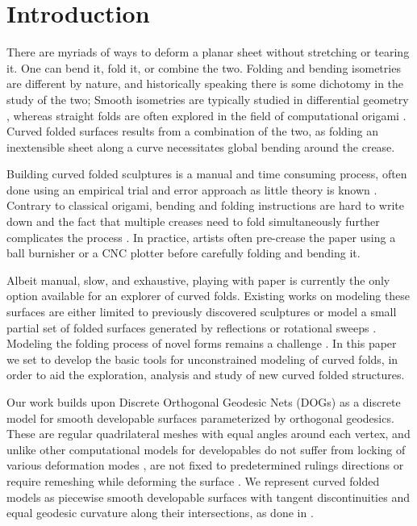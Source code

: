 \section{Introduction}
There are myriads of ways to deform a planar sheet without stretching or tearing it. One can bend it, fold it, or combine the two. Folding and bending isometries are different by nature, and historically speaking there is some dichotomy in the study of the two; Smooth isometries are typically studied in differential geometry \cite{do_carmo}, whereas straight folds are often explored in the field of computational origami \cite{origami_book}. Curved folded surfaces \cite{huffman} results from a combination of the two, as folding an inextensible sheet along a curve necessitates global bending around the crease.

Building curved folded sculptures is a manual and time consuming process, often done using an empirical trial and error approach  as little theory is known \cite{curved_review,huffmann_reconstructing}. Contrary to classical origami, bending and folding instructions are hard to write down and the fact that multiple creases need to fold simultaneously further complicates the process \cite{StringActuated:2017}. In practice, artists often pre-crease the paper using a ball burnisher or a CNC plotter before carefully folding and bending it.

Albeit manual, slow, and exhaustive, playing with paper is currently the only option available for an explorer of curved folds. Existing works on modeling these surfaces are either limited to previously discovered sculptures \cite{curved_folding_kilian,StringActuated:2017} or model a small partial set of folded surfaces generated by reflections or rotational sweeps \cite{Mitani_ref,mitani2009design}. Modeling the folding process of novel forms remains a challenge \cite{curved_review}. In this paper we set to develop the basic tools for unconstrained modeling of curved folds, in order to aid the exploration, analysis and study of new curved folded structures.

Our work builds upon Discrete Orthogonal Geodesic Nets (DOGs) \cite{rabi18,rabi2018shape} as a discrete model for smooth developable surfaces parameterized by orthogonal geodesics. These are regular quadrilateral meshes with equal angles around each vertex, and unlike other computational models for developables do not suffer from locking of various deformation modes \cite{locking1,locking2,grin_shells}, are not fixed to predetermined rulings directions \cite{pottmann_new,curved_folding_kilian} or require remeshing while deforming the surface \cite{StringActuated:2017,SchreckEG2017,Narain}. We represent curved folded models as piecewise smooth developable surfaces with tangent discontinuities and equal geodesic curvature along their intersections, as done in \cite{rabi2018shape}. 

